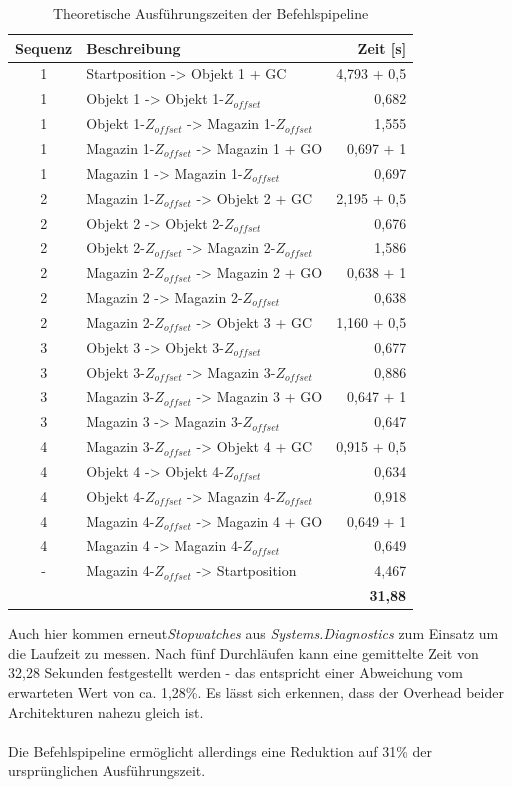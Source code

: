 	\begin{table}[h!]
	\centering
	\begin{tabularx}{\textwidth}{c X r}
		\toprule
		\textbf{Sequenz} & \textbf{Beschreibung} & \textbf{Zeit [s]} \\
		\midrule
		1 & Startposition -> Objekt 1 + GC & 4,793 + 0,5 \\
		1 & Objekt 1 -> Objekt 1-$Z_{offset}$ & 0,682 \\
		1 & Objekt 1-$Z_{offset}$ -> Magazin 1-$Z_{offset}$ & 1,555 \\
		1 & Magazin 1-$Z_{offset}$ -> Magazin 1 + GO & 0,697 + 1 \\
		1 & Magazin 1 -> Magazin 1-$Z_{offset}$ & 0,697 \\
		2 & Magazin 1-$Z_{offset}$ -> Objekt 2 + GC & 2,195 + 0,5 \\
		2 & Objekt 2 -> Objekt 2-$Z_{offset}$ & 0,676 \\
		2 & Objekt 2-$Z_{offset}$ -> Magazin 2-$Z_{offset}$ & 1,586 \\
		2 & Magazin 2-$Z_{offset}$ -> Magazin 2 + GO & 0,638 + 1 \\
		2 & Magazin 2 -> Magazin 2-$Z_{offset}$ & 0,638 \\
		2 & Magazin 2-$Z_{offset}$ -> Objekt 3 + GC & 1,160 + 0,5 \\
		3 & Objekt 3 -> Objekt 3-$Z_{offset}$ & 0,677 \\
		3 & Objekt 3-$Z_{offset}$ -> Magazin 3-$Z_{offset}$ & 0,886 \\
		3 & Magazin 3-$Z_{offset}$ -> Magazin 3 + GO & 0,647 + 1 \\
		3 & Magazin 3 -> Magazin 3-$Z_{offset}$ & 0,647 \\
		4 & Magazin 3-$Z_{offset}$ -> Objekt 4 + GC & 0,915 + 0,5 \\
		4 & Objekt 4 -> Objekt 4-$Z_{offset}$ & 0,634 \\
		4 & Objekt 4-$Z_{offset}$ -> Magazin 4-$Z_{offset}$ & 0,918 \\
		4 & Magazin 4-$Z_{offset}$ -> Magazin 4 + GO & 0,649 + 1 \\
		4 & Magazin 4 -> Magazin 4-$Z_{offset}$ & 0,649 \\
		- & Magazin 4-$Z_{offset}$ -> Startposition & 4,467 \\	
		\bottomrule
		& & \textbf{31,88}
	\end{tabularx}
	\caption{Theoretische Ausführungszeiten der Befehlspipeline}
	\label{tab:ausfuehrungszeiten}
\end{table}
Auch hier kommen erneut\textit{Stopwatches} aus \textit{Systems.Diagnostics} zum Einsatz um die Laufzeit zu messen. Nach fünf Durchläufen kann eine gemittelte Zeit von 32,28 Sekunden festgestellt werden - das entspricht einer Abweichung vom erwarteten Wert von ca. 1,28\%. Es lässt sich erkennen, dass der Overhead beider Architekturen nahezu gleich ist.\\
\\Die Befehlspipeline ermöglicht allerdings eine Reduktion auf 31\% der ursprünglichen Ausführungszeit.
